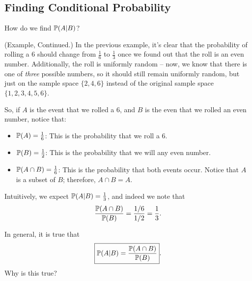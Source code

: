 \documentclass[letterpaper]{article}
\begin{document}
\subsection{Finding Conditional Probability}
How do we find $\mathbb{P}(A | B)$? 
\begin{mdframed}[]
    (Example, Continued.) In the previous example, it's clear that the probability of rolling a 6 should change from $\frac{1}{6}$ to $\frac{1}{3}$ once we found out that the roll is an even number. Additionally, the roll is uniformly random -- now, we know that there is one of \emph{three} possible numbers, so it should still remain uniformly random, but just on the sample space $\{2, 4, 6\}$ instead of the original sample space $\{1, 2, 3, 4, 5, 6\}$. 

    \bigskip 

    So, if $A$ is the event that we rolled a 6, and $B$ is the even that we rolled an even number, notice that: 
    \begin{itemize}
        \item $\mathbb{P}(A) = \frac{1}{6}$: This is the probability that we roll a 6.
        \item $\mathbb{P}(B) = \frac{1}{2}$: This is the probability that we will any even number.
        \item $\mathbb{P}(A \cap B) = \frac{1}{6}$: This is the probability that both events occur. Notice that $A$ is a subset of $B$; therefore, $A \cap B = A$. 
    \end{itemize}
    Intuitively, we expect $\mathbb{P}(A | B) = \frac{1}{3}$, and indeed we note that 
    \[\frac{\mathbb{P}(A \cap B)}{\mathbb{P}(B)} = \frac{1 / 6}{1 / 2} = \frac{1}{3}.\]
\end{mdframed}
In general, it is true that 
\[\boxed{\mathbb{P}(A | B) = \frac{\mathbb{P}(A \cap B)}{\mathbb{P}(B)}}.\]
Why is this true? 
\end{document}
